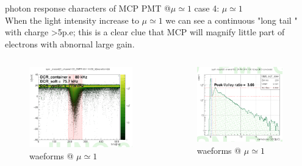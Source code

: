 \documentclass[11pt,compress,xcolor=x11names,UTF8]{beamer}
\begin{document}
\begin{frame}{photon response characters of MCP PMT @$\mu\simeq 1$ }
	case 4: $\mu\simeq 1$\\
	When the light intensity increase to $\mu\simeq 1$ we can see a continuous "long tail " with charge >5p.e; this is a clear clue that MCP will magnify little part of electrons  with abnornal large gain. 
\begin{columns}
\begin{column}{.495\textwidth}
\begin{figure}
\centering
\includegraphics[width=0.97\textwidth]{figure/onepewave.png} %
\caption{waeforms @ $\mu\simeq  1$}
\end{figure}
\end{column}
\begin{column}{.475\textwidth}
\begin{figure}
\centering
\includegraphics[width=0.94\textwidth]{figure/onepeqdc.png} %
\caption{waeforms @ $\mu\simeq  1$}
\end{figure}
\end{column}
\end{columns}
\end{frame}
\end{document}
